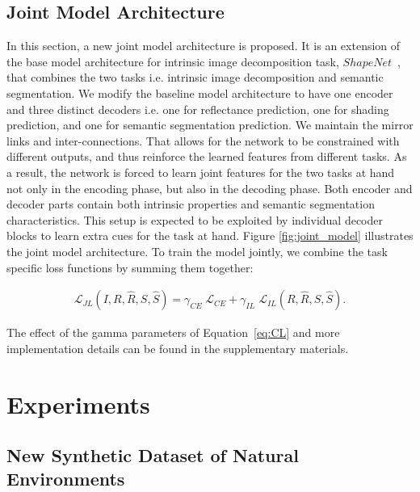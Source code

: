 \documentclass[runningheads]{llncs}
\begin{document}
\subsection{Joint Model Architecture}
In this section, a new joint model architecture is proposed. It is an extension of the base model architecture for intrinsic image decomposition task, $ShapeNet$~\cite{shi}, that combines the two tasks i.e. intrinsic image decomposition and semantic segmentation. We modify the baseline model architecture to have one encoder and three distinct decoders i.e. one for reflectance prediction, one for shading prediction, and one for semantic segmentation prediction. We maintain the mirror links and inter-connections. That allows for the network to be constrained with different outputs, and thus reinforce the learned features from different tasks. As a result, the network is forced to learn joint features for the two tasks at hand not only in the encoding phase, but also in the decoding phase. Both encoder and decoder parts contain both intrinsic properties and semantic segmentation characteristics. This setup is expected to be exploited by individual decoder blocks to learn extra cues for the task at hand. Figure \ref{fig:joint_model} illustrates the joint model architecture. To train the model jointly, we combine the task specific loss functions by summing them together:

\begin{equation} \label{eq:jointL}
\begin{aligned}
\mathcal{L}_{JL}(I, R, \hat{R}, S, \hat{S}) = \gamma_{CE} \; \mathcal{L}_{CE} + \gamma_{IL} \; \mathcal{L}_{IL}(R, \hat{R}, S, \hat{S}).
\end{aligned}
\end{equation}

\noindent The effect of the gamma parameters of Equation~\ref{eq:CL} and more implementation details can be found in the supplementary materials.

\section{Experiments}
\subsection{New Synthetic Dataset of Natural Environments}
\end{document}
